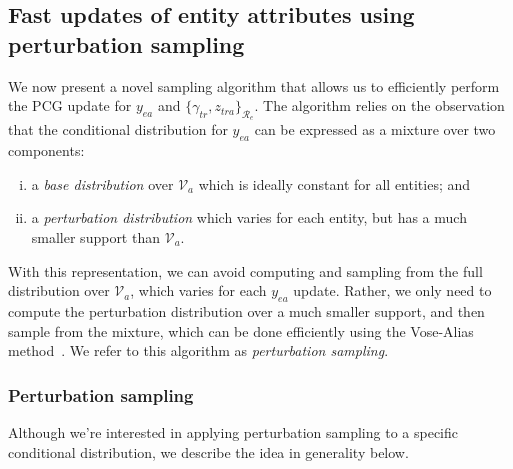 \documentclass[12pt,letterpaper]{article}
\newcommand{\valset}{\mathcal{V}} %
\newcommand{\entset}{\mathcal{R}} %
\newcommand{\1}[1]{\mathbb{I}\!\left[#1\right]} %
\begin{document}
\subsection{Fast updates of entity attributes using perturbation sampling}
\label{sec:pert-sampling}
We now present a novel sampling algorithm that allows us to efficiently 
perform the PCG update for $y_{ea}$ and $\{\gamma_{tr}, 
z_{tra}\}_{\entset_{e}}$.
The algorithm relies on the observation that the conditional 
distribution for $y_{ea}$ can be expressed as a mixture over two 
components:
\begin{enumerate}[(i)]
  \item a \emph{base distribution} over $\valset_{a}$ which is ideally 
  constant for all entities; and
  \item a \emph{perturbation distribution} which varies for each entity, 
  but has a much smaller support than $\valset_{a}$.
\end{enumerate}
With this representation, we can avoid computing and sampling from 
the full distribution over $\valset_{a}$, which varies for each 
$y_{ea}$ update.
Rather, we only need to compute the perturbation distribution over 
a much smaller support, and then sample from the mixture, which can 
be done efficiently using the Vose-Alias 
method~\citep{vose_linear_1991}.
We refer to this algorithm as \emph{perturbation sampling}.

\subsubsection{Perturbation sampling}
Although we're interested in applying perturbation sampling to a 
specific conditional distribution, we describe the idea in 
generality below. 
\end{document}
